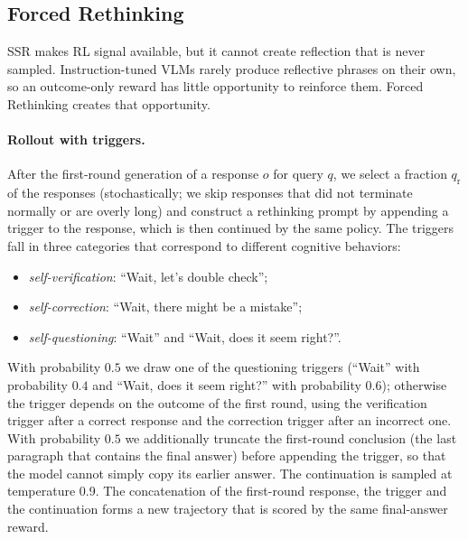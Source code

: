 \documentclass{article}
\begin{document}
\subsection{Forced Rethinking}
\label{sec:forced}

SSR makes RL signal available, but it cannot create reflection that is never sampled. Instruction-tuned VLMs rarely produce reflective phrases on their own, so an outcome-only reward has little opportunity to reinforce them. Forced Rethinking creates that opportunity.

\paragraph{Rollout with triggers.} After the first-round generation of a response $o$ for query $q$, we select a fraction $q_\text{r}$ of the responses (stochastically; we skip responses that did not terminate normally or are overly long) and construct a rethinking prompt by appending a trigger to the response, which is then continued by the same policy. The triggers fall in three categories that correspond to different cognitive behaviors:
\begin{itemize}[leftmargin=*,itemsep=1pt,topsep=2pt]
\item \emph{self-verification}: ``Wait, let's double check'';
\item \emph{self-correction}: ``Wait, there might be a mistake'';
\item \emph{self-questioning}: ``Wait'' and ``Wait, does it seem right?''.
\end{itemize}
With probability $0.5$ we draw one of the questioning triggers (``Wait'' with probability $0.4$ and ``Wait, does it seem right?'' with probability $0.6$); otherwise the trigger depends on the outcome of the first round, using the verification trigger after a correct response and the correction trigger after an incorrect one. With probability $0.5$ we additionally truncate the first-round conclusion (the last paragraph that contains the final answer) before appending the trigger, so that the model cannot simply copy its earlier answer. The continuation is sampled at temperature 0.9. The concatenation of the first-round response, the trigger and the continuation forms a new trajectory that is scored by the same final-answer reward.
\end{document}
